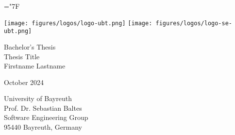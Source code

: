 


\newcommand{\thesistype}{Bachelor's Thesis} %
\newcommand{\thesistitle}{Thesis Title}
\newcommand{\studentname}{Firstname Lastname}
\newcommand{\monthyear}{October 2024}
\newcommand{\studentid}{12345678}
\newcommand{\examiner}{Title Firstname Lastname}
\newcommand{\secondexaminer}{Prof. Dr. Sebastian Baltes}
\newcommand{\supervisor}{Title Firstname Lastname} %
\newcommand{\ubt}{University of Bayreuth, Germany}



\hyphenchar\font=\string"7F %

\frontmatter %

\begin{titlepage}

	\begin{center}
		\texttt{[image: figures/logos/logo-ubt.png]}	
		\hfill
		\texttt{[image: figures/logos/logo-se-ubt.png]}	
	\end{center}
	
	\vspace{4cm}
	
	\begin{center}
		{\large \thesistype}\\
		\vspace{1\baselineskip}
		{\LARGE\textsf{\thesistitle}}\\
		\vspace{2\baselineskip}
		{\large \studentname}\\
	\end{center}

	\vfill
		
	\begin{center}
		{\large \monthyear}
	\end{center}

\end{titlepage}

\newpage
\thispagestyle{empty}
\mbox{}
\newpage

\thispagestyle{empty}
	
\begin{center}
	{\large University of Bayreuth}\\
	\vspace{5pt}
	Prof. Dr. Sebastian Baltes\\
	Software Engineering Group\\
	95440 Bayreuth, Germany\\
\end{center}
	
